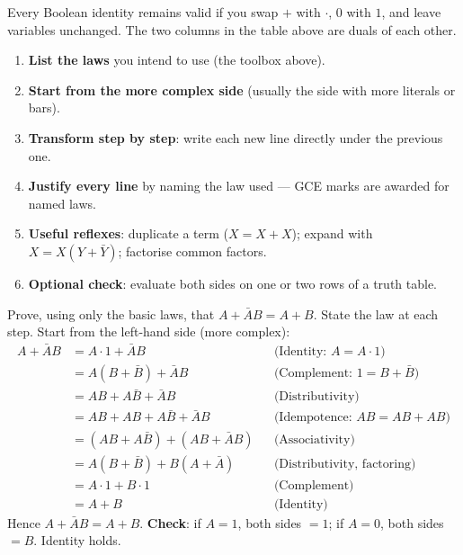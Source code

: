 \documentclass[11pt]{article}
\begin{document}
\begin{aretenir}
Every Boolean identity remains valid if you swap $+$ with $\cdot$, $0$ with $1$, and leave variables unchanged. The two columns in the table above are duals of each other.
\end{aretenir}

\begin{methode}
\begin{enumerate}
\item \textbf{List the laws} you intend to use (the toolbox above).
\item \textbf{Start from the more complex side} (usually the side with more literals or bars).
\item \textbf{Transform step by step}: write each new line directly under the previous one.
\item \textbf{Justify every line} by naming the law used — GCE marks are awarded for named laws.
\item \textbf{Useful reflexes}: duplicate a term ($X=X+X$); expand with $X=X(Y+\bar{Y})$; factorise common factors.
\item \textbf{Optional check}: evaluate both sides on one or two rows of a truth table.
\end{enumerate}
\end{methode}

\begin{exoresolu}
Prove, using only the basic laws, that $A+\bar{A}B=A+B$. State the law at each step.
\tcblower
Start from the left-hand side (more complex):
\begin{align*}
A+\bar{A}B &= A\cdot 1+\bar{A}B && \text{(Identity: } A=A\cdot 1\text{)}\\
&= A(B+\bar{B})+\bar{A}B && \text{(Complement: } 1=B+\bar{B}\text{)}\\
&= AB+A\bar{B}+\bar{A}B && \text{(Distributivity)}\\
&= AB+AB+A\bar{B}+\bar{A}B && \text{(Idempotence: } AB=AB+AB\text{)}\\
&= (AB+A\bar{B})+(AB+\bar{A}B) && \text{(Associativity)}\\
&= A(B+\bar{B})+B(A+\bar{A}) && \text{(Distributivity, factoring)}\\
&= A\cdot 1+B\cdot 1 && \text{(Complement)}\\
&= A+B && \text{(Identity)}
\end{align*}
Hence $A+\bar{A}B=A+B$. \textbf{Check}: if $A=1$, both sides $=1$; if $A=0$, both sides $=B$. Identity holds.
\end{exoresolu}
\end{document}
